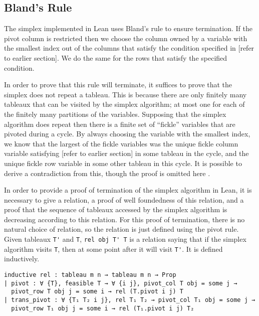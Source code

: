 \documentclass[11pt]{article} %
\begin{document}
\subsection{Bland's Rule}\label{section:bland}

The simplex implemented in Lean uses Bland's rule to ensure termination. If the pivot column is restricted then we choose the column owned by a variable with the smallest index out of the columns that satisfy the condition specified in [refer to earlier section]. We do the same for the rows that satisfy the specified condition.

In order to prove that this rule will terminate, it suffices to prove that the simplex does not repeat a tableau. This is because there are only finitely many tableaux that can be visited by the simplex algorithm; at most one for each of the finitely many partitions of the variables. Supposing that the simplex algorithm does repeat then there is a finite set of ``fickle'' variables that are pivoted during a cycle. By always choosing the variable with the smallest index, we know that the largest of the fickle variables was the unique fickle column variable satisfying [refer to earlier section] in some tableau in the cycle, and the unique fickle row variable in some other tableau in this cycle. It is possible to derive a contradiction from this, though the proof is omitted here \cite{Chvatal}.

In order to provide a proof of termination of the simplex algorithm in Lean, it is necessary to give a relation, a proof of well foundedness of this relation, and a proof that the sequence of tableaux accessed by the simplex algorithm is decreasing according to this relation. For this proof of termination, there is no natural choice of relation, so the relation is just defined using the pivot rule. Given tableaux \lstinline|T'| and \lstinline|T|, \lstinline|rel obj T' T| is a relation saying that if the simplex algorithm visits \lstinline|T|, then at some point after it will visit \lstinline|T'|. It is defined inductively.

\begin{lstlisting}
inductive rel : tableau m n → tableau m n → Prop
| pivot : ∀ {T}, feasible T → ∀ {i j}, pivot_col T obj = some j →
  pivot_row T obj j = some i → rel (T.pivot i j) T
| trans_pivot : ∀ {T₁ T₂ i j}, rel T₁ T₂ → pivot_col T₁ obj = some j →
  pivot_row T₁ obj j = some i → rel (T₁.pivot i j) T₂
\end{lstlisting}
\end{document}

